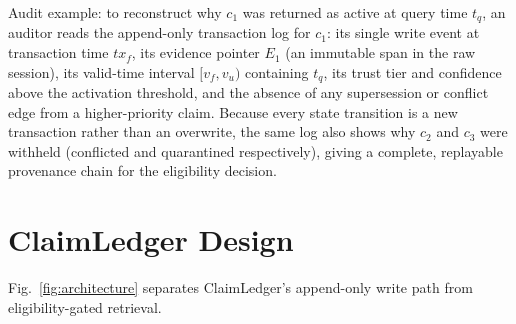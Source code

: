 Audit example: to reconstruct why $c_1$ was returned as active at query time $t_q$, an auditor reads the append-only transaction log for $c_1$: its single write event at transaction time $tx_f$, its evidence pointer $E_1$ (an immutable span in the raw session), its valid-time interval $[v_f,v_u)$ containing $t_q$, its trust tier and confidence above the activation threshold, and the absence of any supersession or conflict edge from a higher-priority claim. Because every state transition is a new transaction rather than an overwrite, the same log also shows why $c_2$ and $c_3$ were withheld (conflicted and quarantined respectively), giving a complete, replayable provenance chain for the eligibility decision.

\section{ClaimLedger Design}\label{sec:design}

Fig.~\ref{fig:architecture} separates ClaimLedger's append-only write path from eligibility-gated retrieval.

